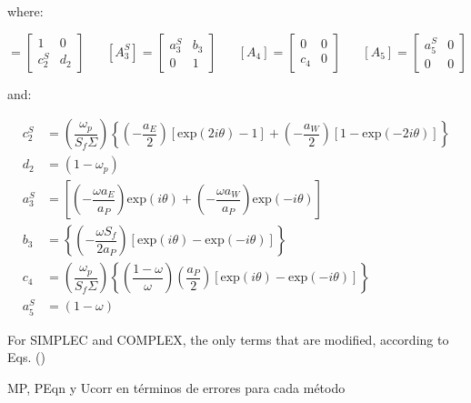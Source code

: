 \documentclass[final,3p,times,10pt,onecolumn]{myElsarticle}
\numberwithin{equation}{section}
\begin{document}
\noindent where:

\begin{equation}
[A^S_2]= 
\begin{bmatrix}
1 & 0 \\
c^S_2 & d_2
\end{bmatrix}
\; \; \; \; \; \;
[A^S_3]= 
\begin{bmatrix}
a^S_3 & b_3 \\
0 & 1
\end{bmatrix}
\; \; \; \; \; \;
[A_4]= 
\begin{bmatrix}
0 & 0 \\
c_4 & 0
\end{bmatrix}
\; \; \; \; \; \;
[A_5]= 
\begin{bmatrix}
a^S_5 & 0 \\
0 & 0
\end{bmatrix}
\end{equation}

\noindent and:

\begin{equation}
\begin{split}
     c^S_2 &= \left( \dfrac{\omega_p}{S_f \Sigma} \right) 
                    \left\{ \left(-\dfrac{a_E}{2} \right) \left[\text{exp} (2 i \theta) - 1 \right] +
                            \left(-\dfrac{a_W}{2} \right) \left[1 - \text{exp} (-2 i \theta)\right]
                    \right\} \\
     d_2 &= (1-\omega_p) \\
     a^S_3 &= \left[\left(-\dfrac{\omega a_E}{a_P}\right) \text{exp} (i \theta) + \left(- \dfrac{\omega a_W}{a_P}\right) \text{exp} (- i \theta)\right] \\
     b_3 &= \left\{\left(-\dfrac{\omega S_f}{2 a_P}\right) \left[\text{exp} (i \theta)-\text{exp} (-i \theta)\right] \right\} \\ 
     c_4 &= \left( \dfrac{\omega_p}{S_f \Sigma} \right) 
                    \left\{ \left(\dfrac{1-\omega}{\omega} \right) \left(\dfrac{a_P}{2} \right) \left[\text{exp} (i \theta) - \text{exp} (- i \theta) \right] 
                    \right\} \\
     a^S_5 &= (1-\omega)      
\end{split}
\end{equation}

For SIMPLEC and COMPLEX, the only terms that are modified, according to Eqs. ()



{\color{red}
MP, PEqn y Ucorr en términos de errores para cada método
}
\end{document}
